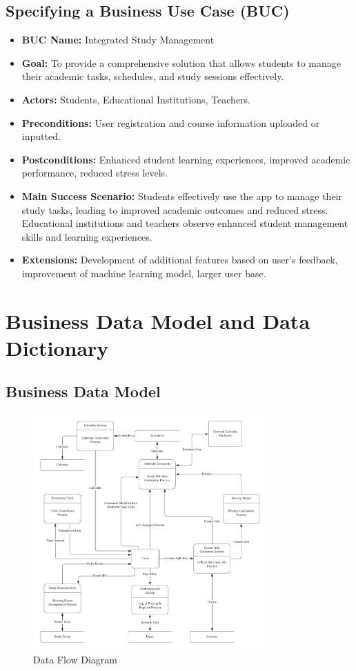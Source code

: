\documentclass[12pt]{article}
\begin{document}
\subsection{Specifying a Business Use Case (BUC)}
\begin{itemize}
    \item \textbf{BUC Name:} Integrated Study Management
    \item \textbf{Goal:} To provide a comprehensive solution that allows students to manage their academic tasks, schedules, and study sessions effectively.
    \item \textbf{Actors:} Students, Educational Institutions, Teachers.
    \item \textbf{Preconditions:} User registration and course information uploaded or inputted.
    \item \textbf{Postconditions:} Enhanced student learning experiences, improved academic performance, reduced stress levels.
    \item \textbf{Main Success Scenario:} Students effectively use the app to manage their study tasks, leading to improved academic outcomes and reduced stress. Educational institutions and teachers observe enhanced student management skills and learning experiences.
    \item \textbf{Extensions:} Development of additional features based on user's feedback, improvement of machine learning model, larger user base.
\end{itemize}

\section{Business Data Model and Data Dictionary}
\subsection{Business Data Model}
\begin{figure}[htbp]
  \centering
  \includegraphics[width=0.8\textwidth]{DFD.png}
  \caption{Data Flow Diagram} 
  \label{fig:dfd} 
\end{figure}
\end{document}
